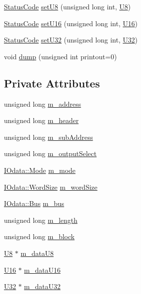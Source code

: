 \begin{DoxyCompactItemize}
\item 
\hyperlink{classStatusCode}{Status\+Code} \hyperlink{classIOdata_a6c4fb2f2af01889ada889c2b7aceb24d}{set\+U8} (unsigned long int, \hyperlink{classIOdata_a18d1354b7cdaf0f8a8001fdbb3ced418}{U8})
\item 
\hyperlink{classStatusCode}{Status\+Code} \hyperlink{classIOdata_aa9ade5ce3944c8e2b831533b6f876caf}{set\+U16} (unsigned long int, \hyperlink{classIOdata_a1eb45b348534a7c19a4a99b746e693ff}{U16})
\item 
\hyperlink{classStatusCode}{Status\+Code} \hyperlink{classIOdata_abbed9a057203bc763f97b85fb385f36b}{set\+U32} (unsigned long int, \hyperlink{classIOdata_a96fb57f5fcd87b708743abd3c86a5198}{U32})
\item 
void \hyperlink{classIOdata_a208e24222bf2044a4ff8bbb1a6bdc13b}{dump} (unsigned int printout=0)
\end{DoxyCompactItemize}
\subsection*{Private Attributes}
\begin{DoxyCompactItemize}
\item 
unsigned long \hyperlink{classIOdata_a965810e1888b904c575277f50cea734a}{m\+\_\+address}
\item 
unsigned long \hyperlink{classIOdata_a46ec7dbfa257c02be1d39c4799f157d3}{m\+\_\+header}
\item 
unsigned long \hyperlink{classIOdata_a562f84e5cace1e392f1b0fca553fff78}{m\+\_\+sub\+Address}
\item 
unsigned long \hyperlink{classIOdata_acc46d71243b542e68277e242effa7f1b}{m\+\_\+output\+Select}
\item 
\hyperlink{classIOdata_a044e9a4a0c6d25a43ebfe29c4fa4f1e5}{I\+Odata\+::\+Mode} \hyperlink{classIOdata_a0782e31763fa855f1ecbd377dce538e6}{m\+\_\+mode}
\item 
\hyperlink{classIOdata_a37c53ebf4bf8d866aac8af572962a84c}{I\+Odata\+::\+Word\+Size} \hyperlink{classIOdata_a719b0ce607ada4fa91b12d6ecfa1b4c9}{m\+\_\+word\+Size}
\item 
\hyperlink{classIOdata_a99aa7bed39364c4359ab8a7596bc013c}{I\+Odata\+::\+Bus} \hyperlink{classIOdata_a42c07a9b3f43ec35dd18d13a67d294cc}{m\+\_\+bus}
\item 
unsigned long \hyperlink{classIOdata_afabe57441da019eb614d277799106aac}{m\+\_\+length}
\item 
unsigned long \hyperlink{classIOdata_a6d1ce9f88db6b97ce61098a3693e253f}{m\+\_\+block}
\item 
\hyperlink{classIOdata_a18d1354b7cdaf0f8a8001fdbb3ced418}{U8} $\ast$ \hyperlink{classIOdata_a9c4c0dc5104f7f3b170e30ab78fe61e7}{m\+\_\+data\+U8}
\item 
\hyperlink{classIOdata_a1eb45b348534a7c19a4a99b746e693ff}{U16} $\ast$ \hyperlink{classIOdata_a8d698e077b7898009691b9086a3e6453}{m\+\_\+data\+U16}
\item 
\hyperlink{classIOdata_a96fb57f5fcd87b708743abd3c86a5198}{U32} $\ast$ \hyperlink{classIOdata_a247cdaefd87084e3cad1d530d592d99a}{m\+\_\+data\+U32}
\end{DoxyCompactItemize}
